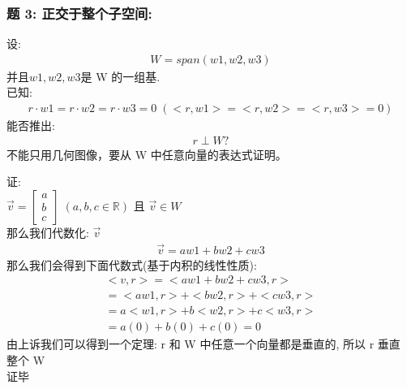 \documentclass[12pt]{article}
\begin{document}
\begin{flushleft}
    \subsubsection{题 3: 正交于整个子空间:}
    设: \\
    \begin{align}
        W = span(w1,w2,w3)
    \end{align}
    并且$w1,w2,w3$是 W 的一组基. \\
    已知: \\
    \begin{align}
        r \cdot w1 = r \cdot w2 = r \cdot w3 = 0 \; (<r,w1> = <r,w2> = <r,w3> = 0 )
    \end{align}
    能否推出: \\
    \begin{align}
        r \perp W  ?
    \end{align}
    不能只用几何图像，要从 W 中任意向量的表达式证明。

    证: \\
    $\vec{v} = \begin{bmatrix}
            a \\
            b \\
            c
        \end{bmatrix} \; ({a, b, c \in \mathbb{R}})$ 且 $\vec{v} \in W$ \\
    那么我们代数化: $\vec{v}$
    \begin{align}
        \vec{v} = aw1 + bw2 + cw3
    \end{align}
    那么我们会得到下面代数式(基于内积的线性性质):  \\
    \begin{align}
        <v, r> = <aw1 + bw2 + cw3 , r> \\
        = <aw1, r> + <bw2,r> + <cw3,r> \\
        = a<w1,r> + b<w2,r> + c<w3,r>  \\
        = a(0) + b(0) + c(0)
        = 0
    \end{align}
    由上诉我们可以得到一个定理: r 和 W 中任意一个向量都是垂直的, 所以 r 垂直 整个 W \\
    证毕

\end{flushleft}
\end{document}
